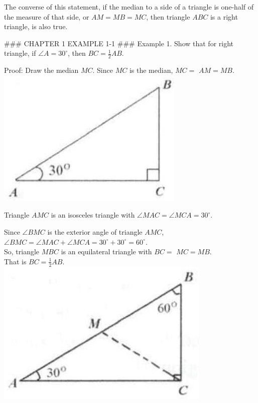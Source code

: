 \documentclass[10pt]{article}
\begin{document}
The converse of this statement, if the median to a side of a triangle is one-half of the measure of that side, or \(A M=M B=M C\), then triangle \(A B C\) is a right triangle, is also true.

### CHAPTER 1 EXAMPLE 1-1 ###
Example 1. Show that for right triangle, if \(\angle A=30^{\circ}\), then \(B C=\frac{1}{2} A B\).

Proof:
Draw the median \(M C\). Since \(M C\) is the median, \(M C=\) \(A M=M B\).\\
\includegraphics[max width=\textwidth, center]{2025_04_17_97bc1f7e44d93c271a88g-009(4)}

Triangle \(A M C\) is an isosceles triangle with \(\angle M A C=\angle M C A=30^{\circ}\).

Since \(\angle B M C\) is the exterior angle of triangle \(A M C\), \(\angle B M C=\angle M A C+\angle M C A=30^{\circ}+30^{\circ}=60^{\circ}\).\\
So, triangle \(M B C\) is an equilateral triangle with \(B C=\) \(M C=M B\).\\
That is \(B C=\frac{1}{2} A B\).\\
\includegraphics[max width=\textwidth, center]{2025_04_17_97bc1f7e44d93c271a88g-009(3)}
\end{document}
